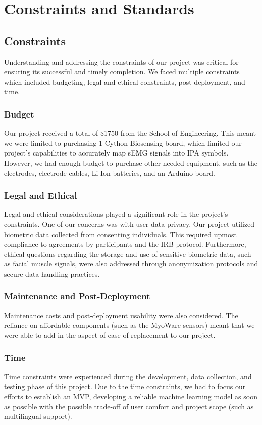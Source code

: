 \chapter{Constraints and Standards}

\section{Constraints}
Understanding and addressing the constraints of our project was critical for ensuring its successful and timely completion. We faced multiple constraints which included budgeting, legal and ethical constraints, post-deployment, and time.
\subsection{Budget}
Our project received a total of \$1750 from the School of Engineering. This meant we were limited to purchasing 1 Cython Biosensing board, which limited our project's capabilities to accurately map sEMG signals into IPA symbols. However, we had enough budget to purchase other needed equipment, such as the electrodes, electrode cables, Li-Ion batteries, and an Arduino board.  
\subsection{Legal and Ethical}
Legal and ethical considerations played a significant role in the project's constraints. One of our concerns was with user data privacy. Our project utilized biometric data collected from consenting individuals. This required upmost compliance to agreements by participants and the IRB protocol. Furthermore, ethical questions regarding the storage and use of sensitive biometric data, such as facial muscle signals, were also addressed through anonymization protocols and secure data handling practices.
\subsection{Maintenance and Post-Deployment}
Maintenance costs and post-deployment usability were also considered. The reliance on affordable components (such as the MyoWare sensors) meant that we were able to add in the aspect of ease of replacement to our project. 

\subsection{Time}
Time constraints were experienced during the development, data collection, and testing phase of this project. Due to the time constraints, we had to focus our efforts to establish an MVP, developing a reliable machine learning model as soon as possible with the possible trade-off of user comfort and project scope (such as multilingual support).


